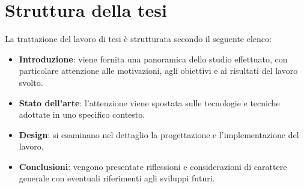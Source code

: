 \section{Struttura della tesi}
La trattazione del lavoro di tesi è strutturata secondo il seguente elenco:
\begin{itemize}
    \item \textbf{Introduzione}: viene fornita una panoramica dello studio effettuato, con particolare attenzione alle motivazioni, 
    agli obiettivi e ai risultati del lavoro svolto.
    \item \textbf{Stato dell'arte}: l'attenzione viene spostata sulle tecnologie e tecniche adottate in uno specifico contesto.
    \item \textbf{Design}: si esaminano nel dettaglio la progettazione e l'implementazione del lavoro.
    \item \textbf{Conclusioni}: vengono presentate riflessioni e considerazioni di carattere generale con eventuali riferimenti
    agli sviluppi futuri.
\end{itemize}
